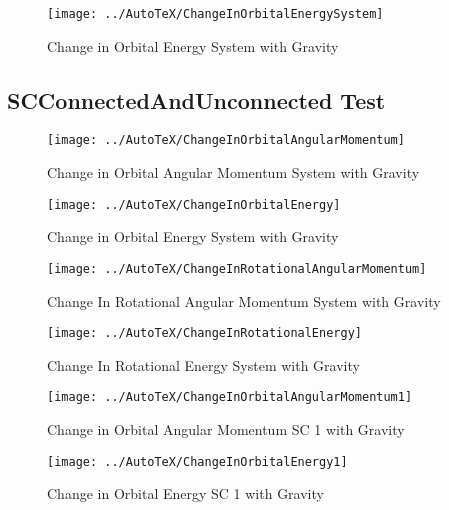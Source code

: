 \begin{figure}[htbp]
	\centerline{
		\texttt{[image: ../AutoTeX/ChangeInOrbitalEnergySystem]}}
	\caption{Change in Orbital Energy System with Gravity}
	\label{fig:ChangeInOrbitalEnergySystem}
\end{figure}

\clearpage

\subsection{SCConnectedAndUnconnected Test}

\begin{figure}[htbp]
	\centerline{
		\texttt{[image: ../AutoTeX/ChangeInOrbitalAngularMomentum]}}
	\caption{Change in Orbital Angular Momentum System with Gravity}
	\label{fig:ChangeInOrbitalAngularMomentum}
\end{figure}

\begin{figure}[htbp]
	\centerline{
		\texttt{[image: ../AutoTeX/ChangeInOrbitalEnergy]}}
	\caption{Change in Orbital Energy System with Gravity}
	\label{fig:ChangeInOrbitalEnergy}
\end{figure}

\begin{figure}[htbp]
	\centerline{
		\texttt{[image: ../AutoTeX/ChangeInRotationalAngularMomentum]}}
	\caption{Change In Rotational Angular Momentum System with Gravity}
	\label{fig:ChangeInRotationalAngularMomentum}
\end{figure}

\begin{figure}[htbp]
	\centerline{
		\texttt{[image: ../AutoTeX/ChangeInRotationalEnergy]}}
	\caption{Change In Rotational Energy System with Gravity}
	\label{fig:ChangeInRotationalEnergy}
\end{figure}

\begin{figure}[htbp]
	\centerline{
		\texttt{[image: ../AutoTeX/ChangeInOrbitalAngularMomentum1]}}
	\caption{Change in Orbital Angular Momentum SC 1 with Gravity}
	\label{fig:ChangeInOrbitalAngularMomentum1}
\end{figure}

\begin{figure}[htbp]
	\centerline{
		\texttt{[image: ../AutoTeX/ChangeInOrbitalEnergy1]}}
	\caption{Change in Orbital Energy SC 1 with Gravity}
	\label{fig:ChangeInOrbitalEnergy1}
\end{figure}

